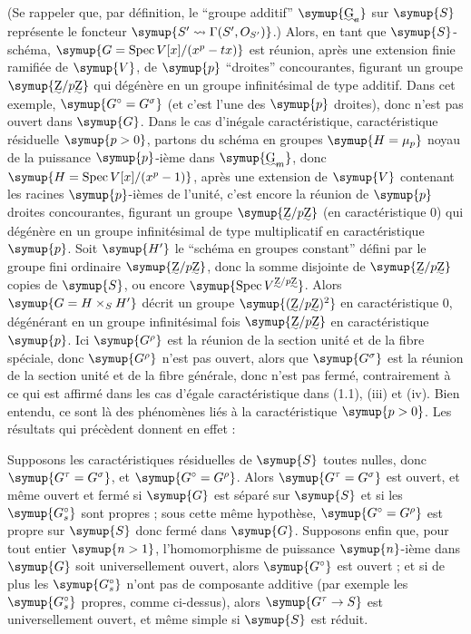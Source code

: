 (Se rappeler que, par définition, le ``groupe additif'' $\symup{\text{\uwave{G}}_a}$ sur $\symup{S}$
représente le foncteur $\symup{S'\rightsquigarrow\Gamma(S',O_{S'})}$.) Alors, en
tant que $\symup{S}$-schéma, $\symup{G=\operatorname{Spec}V[x]/(x^p-tx)}$ est réunion, après une extension finie ramifiée de $\symup{V}$, de $\symup{p}$ ``droites'' concourantes, figurant un groupe
$\symup{\text{\uwave{Z}}/p\text{\uwave{Z}}}$ qui dégénère en un groupe infinitésimal de type additif.
Dans cet exemple, $\symup{G^\circ=G^\sigma}$ (et c'est l'une des $\symup{p}$ droites), donc
n'est pas ouvert dans $\symup{G}$. Dans le cas d'inégale caractéristique, caractéristique résiduelle $\symup{p>0}$, partons du schéma en groupes
$\symup{H=\mu_p}$ noyau de la puissance $\symup{p}$-ième dans $\symup{\text{\uwave{G}}_m}$, donc $\symup{H=\operatorname{Spec}V[x]/(x^p-1)}$, après une extension de $\symup{V}$ contenant les racines $\symup{p}$-ièmes de l'unité, c'est encore la réunion de $\symup{p}$ droites concourantes, figurant un groupe
$\symup{\text{\uwave{Z}}/p\text{\uwave{Z}}}$ (en caractéristique 0) qui dégénère en un groupe
infinitésimal de type multiplicatif en caractéristique $\symup{p}$. Soit $\symup{H'}$ le
``schéma en groupes constant'' défini par le groupe fini ordinaire
$\symup{\text{\uwave{Z}}/p\text{\uwave{Z}}}$, donc la somme disjointe de $\symup{\text{\uwave{Z}}/p\text{\uwave{Z}}}$
copies de $\symup{S}$, ou encore $\symup{\operatorname{Spec}V^{\text{\uwave{Z}}/p\text{\uwave{Z}}}}$. Alors
$\symup{G=H\times_S H'}$ décrit un groupe $\symup{(\text{\uwave{Z}}/p\text{\uwave{Z}})^2}$ en
caractéristique 0, dégénérant en un groupe infinitésimal fois
$\symup{\text{\uwave{Z}}/p\text{\uwave{Z}}}$ en caractéristique $\symup{p}$. Ici $\symup{G^\rho}$ est la réunion de
la section unité et de la fibre spéciale, donc $\symup{G^\rho}$ n'est pas ouvert,
alors que $\symup{G^\sigma}$ est la réunion de la section unité et de la fibre
générale, donc n'est pas fermé, contrairement à ce qui est affirmé dans les
cas d'égale caractéristique dans (1.1), (iii) et (iv). Bien entendu, ce sont là
des phénomènes liés à la caractéristique $\symup{p>0}$. Les résultats qui précèdent
donnent en effet :

 Supposons les caractéristiques résiduelles de $\symup{S}$
toutes nulles, donc $\symup{G^\tau=G^\sigma}$, et $\symup{G^\circ=G^\rho}$. Alors
$\symup{G^\tau=G^\sigma}$ est ouvert, et même ouvert et fermé si $\symup{G}$ est séparé sur
$\symup{S}$ et si les $\symup{G_s^\circ}$ sont propres ; sous cette même hypothèse,
$\symup{G^\circ=G^\rho}$ est propre sur $\symup{S}$ donc fermé dans $\symup{G}$. Supposons enfin que,
pour tout entier $\symup{n>1}$, l'homomorphisme de puissance $\symup{n}$-ième dans $\symup{G}$ soit
universellement ouvert, alors $\symup{G^\circ}$ est ouvert ; et si de plus les
$\symup{G_s^\circ}$ n'ont pas de composante additive (par exemple les $\symup{G_s^\circ}$
propres, comme ci-dessus), alors $\symup{G^\tau\to S}$ est universellement
ouvert, et même simple si $\symup{S}$ est réduit.

